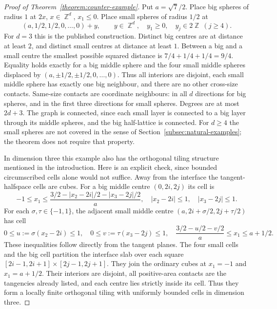 \documentclass[12pt]{amsart}
\numberwithin{equation}{section}
\DeclareMathOperator{\Z}{\mathbb{Z}}
\begin{document}
\begin{proof}[Proof of Theorem~\ref{theorem:counter-example}]
Put $a=\sqrt7/2$. Place big spheres of radius $1$ at $2x$, $x\in\Z^d$, $x_1\leq0$. Place small spheres of radius $1/2$ at
\[
 (a,1/2,1/2,0,\ldots,0)+y,\qquad y\in\Z^d,\quad y_1\geq0,
 \quad y_j\in2\Z\ (j\geq4).
\]
For $d=3$ this is the published construction. Distinct big centres are at distance at least $2$, and distinct small centres at distance at least $1$. Between a big and a small centre the smallest possible squared distance is $7/4+1/4+1/4=9/4$. Equality holds exactly for a big middle sphere and the four small middle spheres displaced by $(a,\pm1/2,\pm1/2,0,\ldots,0)$. Thus all interiors are disjoint, each small middle sphere has exactly one big neighbour, and there are no other cross-size contacts. Same-size contacts are coordinate neighbours: in all $d$ directions for big spheres, and in the first three directions for small spheres. Degrees are at most $2d+3$. The graph is connected, since each small layer is connected to a big layer through its middle spheres, and the big half-lattice is connected. For $d\geq4$ the small spheres are not covered in the sense of Section~\ref{subsec:natural-examples}; the theorem does not require that property.

In dimension three this example also has the orthogonal tiling structure mentioned in the introduction. Here is an explicit check, since bounded circumscribed cells alone would not suffice. Away from the interface the tangent-halfspace cells are cubes. For a big middle centre $(0,2i,2j)$ its cell is
\[
 -1\leq x_1\leq\frac{3/2-|x_2-2i|/2-|x_3-2j|/2}{a},\quad
 |x_2-2i|\leq1,\quad |x_3-2j|\leq1.
\]
For each $\sigma,\tau\in\{-1,1\}$, the adjacent small middle centre $(a,2i+\sigma/2,2j+\tau/2)$ has cell
\[
 0\leq u:=\sigma(x_2-2i)\leq1,\quad
 0\leq v:=\tau(x_3-2j)\leq1,\quad
 \frac{3/2-u/2-v/2}{a}\leq x_1\leq a+1/2.
\]
These inequalities follow directly from the tangent planes. The four small cells and the big cell partition the interface slab over each square $[2i-1,2i+1]\times[2j-1,2j+1]$. They join the ordinary cubes at $x_1=-1$ and $x_1=a+1/2$. Their interiors are disjoint, all positive-area contacts are the tangencies already listed, and each centre lies strictly inside its cell. Thus they form a locally finite orthogonal tiling with uniformly bounded cells in dimension three.


\end{proof}
\end{document}
